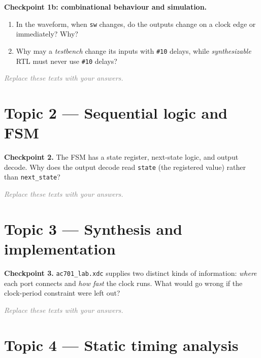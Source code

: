 \documentclass[11pt]{article}
\newcommand{\answerbox}[2]{%
  \begin{tcolorbox}[colback=ansbg,colframe=tudelft,boxrule=0.8pt,title={#1},
                    fonttitle=\bfseries\small]#2\end{tcolorbox}}
\begin{document}
\noindent\textbf{Checkpoint 1b: combinational behaviour and simulation.}
\begin{enumerate}[noitemsep]
  \item In the waveform, when \texttt{sw} changes, do the outputs change on a clock edge or immediately? Why?
  \item Why may a \emph{testbench} change its inputs with \texttt{\#10} delays, while \emph{synthesizable} RTL
        must never use \texttt{\#10} delays?
\end{enumerate}
\answerbox{Your answer}{\textcolor{gray}{\textit{Replace these texts with your answers.}}\par\rule{0pt}{0.14\textheight}}

\section*{Topic 2 --- Sequential logic and FSM}

\noindent\textbf{Checkpoint 2.} The FSM has a state register, next-state logic, and output decode. Why does
the output decode read \texttt{state} (the registered value) rather than \texttt{next\_state}?
\answerbox{Your answer}{\textcolor{gray}{\textit{Replace these texts with your answers.}}\par\rule{0pt}{0.12\textheight}}

\section*{Topic 3 --- Synthesis and implementation}

\noindent\textbf{Checkpoint 3.} \texttt{ac701\_lab.xdc} supplies two distinct kinds of information:
\emph{where} each port connects and \emph{how fast} the clock runs. What would go wrong if the clock-period
constraint were left out?
\answerbox{Your answer}{\textcolor{gray}{\textit{Replace these texts with your answers.}}\par\rule{0pt}{0.12\textheight}}

\section*{Topic 4 --- Static timing analysis}
\end{document}
